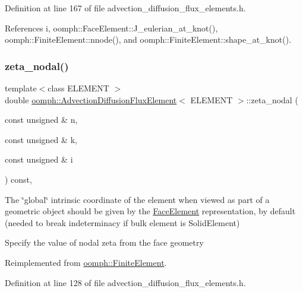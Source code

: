 Definition at line 167 of file advection\+\_\+diffusion\+\_\+flux\+\_\+elements.\+h.



References i, oomph\+::\+Face\+Element\+::\+J\+\_\+eulerian\+\_\+at\+\_\+knot(), oomph\+::\+Finite\+Element\+::nnode(), and oomph\+::\+Finite\+Element\+::shape\+\_\+at\+\_\+knot().

\mbox{\label{classoomph_1_1AdvectionDiffusionFluxElement_aaf962dc2e0fccdafa7210bbaaf2fbbd6}} 
\subsubsection{\texorpdfstring{zeta\+\_\+nodal()}{zeta\_nodal()}}
{\footnotesize\ttfamily template$<$class E\+L\+E\+M\+E\+NT $>$ \\
double \hyperlink{classoomph_1_1AdvectionDiffusionFluxElement}{oomph\+::\+Advection\+Diffusion\+Flux\+Element}$<$ E\+L\+E\+M\+E\+NT $>$\+::zeta\+\_\+nodal (\begin{DoxyParamCaption}\item[{const unsigned \&}]{n,  }\item[{const unsigned \&}]{k,  }\item[{const unsigned \&}]{i }\end{DoxyParamCaption}) const\hspace{0.3cm}{\ttfamily [inline]}, {\ttfamily [virtual]}}



The \char`\"{}global\char`\"{} intrinsic coordinate of the element when viewed as part of a geometric object should be given by the \hyperlink{classoomph_1_1FaceElement}{Face\+Element} representation, by default (needed to break indeterminacy if bulk element is Solid\+Element) 

Specify the value of nodal zeta from the face geometry 

Reimplemented from \hyperlink{classoomph_1_1FiniteElement_a849561c5fbcbc07dc49d2dc6cca68559}{oomph\+::\+Finite\+Element}.



Definition at line 128 of file advection\+\_\+diffusion\+\_\+flux\+\_\+elements.\+h.



